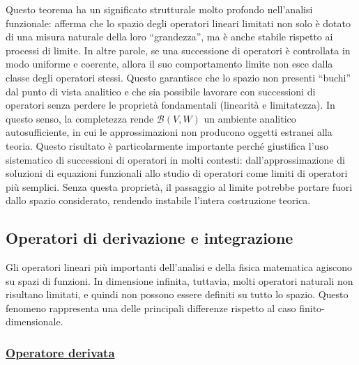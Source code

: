 \documentclass[a4paper,12pt]{report}
\begin{document}
Questo teorema ha un significato strutturale molto profondo nell’analisi funzionale: afferma che lo spazio degli operatori lineari limitati non solo è dotato di una misura naturale della loro “grandezza”, ma è anche stabile rispetto ai processi di limite. In altre parole, se una successione di operatori è controllata in modo uniforme e coerente, allora il suo comportamento limite non esce dalla classe degli operatori stessi. Questo garantisce che lo spazio non presenti “buchi” dal punto di vista analitico e che sia possibile lavorare con successioni di operatori senza perdere le proprietà fondamentali (linearità e limitatezza). In questo senso, la completezza rende $\mathcal{B}(V,W)$ un ambiente analitico autosufficiente, in cui le approssimazioni non producono oggetti estranei alla teoria. Questo risultato è particolarmente importante perché giustifica l’uso sistematico di successioni di operatori in molti contesti: dall’approssimazione di soluzioni di equazioni funzionali allo studio di operatori come limiti di operatori più semplici. Senza questa proprietà, il passaggio al limite potrebbe portare fuori dallo spazio considerato, rendendo instabile l’intera costruzione teorica.

\newpage

\subsection{Operatori di derivazione e integrazione}

Gli operatori lineari più importanti dell’analisi e della fisica matematica agiscono su spazi di funzioni. In dimensione infinita, tuttavia, molti operatori naturali non risultano limitati, e quindi non possono essere definiti su tutto lo spazio. Questo fenomeno rappresenta una delle principali differenze rispetto al caso finito-dimensionale.

\subsubsection{\underline{Operatore derivata}}
\end{document}
